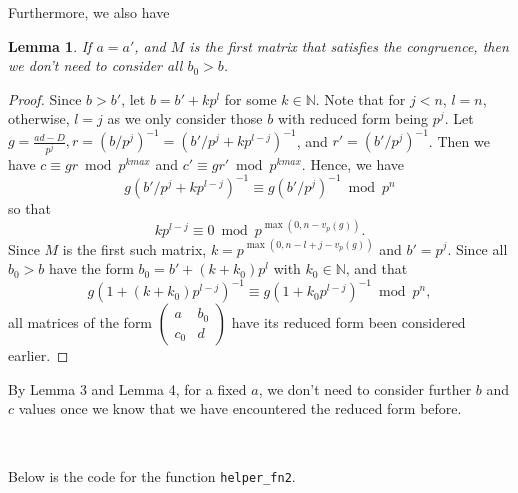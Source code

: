 \documentclass[letterpaper,12pt]{article}
\newtheorem{lemma}{Lemma}
\begin{document}
Furthermore, we also have 
\begin{lemma}
If $a = a'$, and $M$ is the first matrix that satisfies the congruence,
then we don't need to consider all $b_0 > b$. 
\end{lemma}
\begin{proof}
Since $b > b'$, let $b = b' + k p^l$ for some $k \in \mathbb{N}$.
Note that for $j < n$, $l = n$, otherwise, $l = j$ as we only consider those 
$b$ with reduced form being $p^j$.
Let $g = \frac{ad-D}{p^j}, r = (b / p^j)^{-1} = (b' / p^j + kp^{l-j})^{-1}$, and 
$r' = (b' / p^j)^{-1}$.
Then we have $c \equiv gr \bmod p^{kmax}$ and $c' \equiv gr' \bmod p^{kmax}$.
Hence, we have
\[
g(b' / p^j + kp^{l-j})^{-1} \equiv g(b' / p^j)^{-1} \bmod p^n
\]
so that 
\[
kp^{l-j} \equiv 0 \bmod p^{\max(0, n - v_p(g))}.
\]
Since $M$ is the first such matrix, $k = p^{\max(0, n-l+j - v_p(g))}$
and $b' = p^j$. 
Since all $b_0 > b$ have the form $b_0 = b'+ (k+k_0)p^l$ with $k_0 \in \mathbb{N}$,
and that 
\[
g(1 + (k+ k_0)p^{l-j})^{-1} \equiv g(1 + k_0p^{l-j})^{-1} \bmod p^n,
\]
all matrices of the form 
$\begin{pmatrix} a & b_0 \\ c_0 & d \end{pmatrix}$
have its reduced form been considered earlier.

\end{proof}

By Lemma 3 and Lemma 4, for a fixed $a$, we don't need 
to consider further $b$ and $c$ values once we know that we 
have encountered the reduced form before.

\

Below is the code for the function \texttt{helper\_fn2}.
\end{document}
